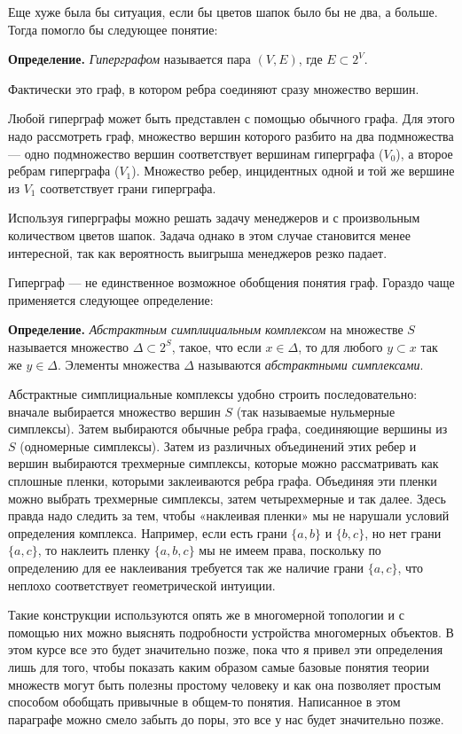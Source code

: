 Еще хуже была бы ситуация, если бы цветов шапок было бы не два, а больше. Тогда помогло бы следующее понятие:

{\bfseries Определение.} {\slshape Гиперграфом} называется пара $(V, E)$, где $E\subset 2^V$.

Фактически это граф, в котором ребра соединяют сразу множество вершин.

Любой гиперграф может быть представлен с помощью обычного графа. Для этого надо рассмотреть граф, множество вершин которого разбито на два подмножества — одно подмножество вершин соответствует вершинам гиперграфа ($V_0$), а второе ребрам гиперграфа ($V_1$). Множество ребер, инцидентных одной и той же вершине из $V_1$ соответствует грани гиперграфа.

Используя гиперграфы можно решать задачу менеджеров и с произвольным количеством цветов шапок. Задача однако в этом случае становится менее интересной, так как вероятность выигрыша менеджеров резко падает.

Гиперграф — не единственное возможное обобщения понятия граф. Гораздо чаще применяется следующее определение:

{\bfseries Определение.} {\slshape Абстрактным симплициальным комплексом} на множестве $S$ называется множество $\Delta\subset 2^S$, такое, что если $x\in \Delta$, то для любого $y\subset x$ так же $y\in\Delta$. Элементы множества $\Delta$ называются {\slshape абстрактными симплексами}.

Абстрактные симплициальные комплексы удобно строить последовательно: вначале выбирается множество вершин $S$ (так называемые нульмерные симплексы). Затем выбираются обычные ребра графа, соединяющие вершины из $S$ (одномерные симплексы). Затем из различных объединений этих ребер и вершин выбираются трехмерные симплексы, которые можно рассматривать как сплошные пленки, которыми заклеиваются ребра графа. Объединяя эти пленки можно выбрать трехмерные симплексы, затем четырехмерные и так далее. Здесь правда надо следить за тем, чтобы «наклеивая пленки» мы не нарушали условий определения комплекса. Например, если есть грани $\{a, b\}$ и $\{b, c\}$, но нет грани $\{a, c\}$, то наклеить пленку $\{a, b, c\}$ мы не имеем права, поскольку по определению для ее наклеивания требуется так же наличие грани $\{a, c\}$, что неплохо соответствует геометрической интуиции.

Такие конструкции используются опять же в многомерной топологии и с помощью них можно выяснять подробности устройства многомерных объектов. В этом курсе все это будет значительно позже, пока что я привел эти определения лишь для того, чтобы показать каким образом самые базовые понятия теории множеств могут быть полезны простому человеку и как она позволяет простым способом обобщать привычные в общем-то понятия. Написанное в этом параграфе можно смело забыть до поры, это все у нас будет значительно позже.
